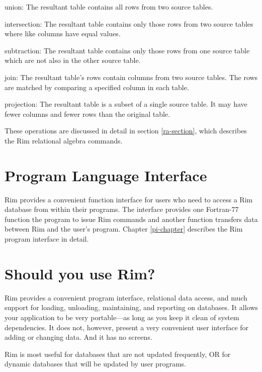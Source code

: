 \begin{List}
\item[union:] The resultant table contains all rows from
  two source tables.
 
\item[intersection:] The resultant table contains only  those rows from
  two source tables where like columns have equal values.
 
\item[subtraction:] The resultant table contains only those rows from
  one source table which are not also in the other source table.
 
\item[join:] The resultant table's rows contain columns from
  two source tables.  The rows are matched by comparing a specified
  column in each table.
 
\item[projection:] The resultant table is a subset of a single
  source table.  It may have fewer columns and fewer rows
  than the original table.
 
\end{List}
 
These operations are discussed in detail in section
\ref{ra-section}, which describes the Rim relational
algebra commands.
 
 
\section{Program Language Interface}
Rim provides a convenient function interface
for users who need to access a Rim database from
within their programs.  The interface provides one Fortran-77 function
the program to issue Rim commands and another
function transfers data between Rim and the user's program.
Chapter \ref{pi-chapter} describes the Rim program interface
in detail.
 
\section{Should you use Rim?}
Rim provides a convenient program interface,
relational data access,
and much support for loading, unloading,
maintaining, and reporting on databases.  
It allows your application to be very
portable---as long as you keep it clean of system dependencies.
It does not, however, present
a very convenient user interface for adding or changing data.
And it has no screens.  

Rim is most useful for databases that are not updated frequently,
OR for dynamic databases that will be updated by user programs.

